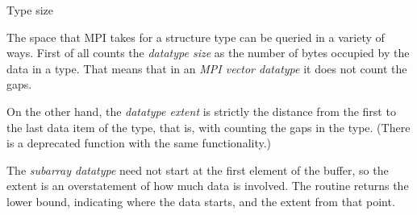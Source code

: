  {Type size}

The space that MPI takes for a structure type can be queried in a
variety of ways. First of all  counts the
\emph{datatype size} as the 
number of bytes occupied by the data in a type. That means that in an
\emph{MPI vector datatype} it does not
count the gaps.
%
%

On the other hand, the \emph{datatype
  extent} is strictly the distance from the
first to the last data item of the type, that is, with counting the
gaps in the type.
%
%
%
(There is a deprecated function  with the same
functionality.)

The \emph{subarray datatype} need not
start at the first element of the buffer, so the extent is an
overstatement of how much data is involved. The routine
 returns the lower bound,
indicating where the data starts, and the extent from that point.
%

\begin{comment}
  Suppose we implement gather (see also Section Gather ) as a spanning
  tree implemented on top of point-to-point routines. Since the receive
  buffer is only valid on the root process, one will need to allocate
  some temporary space for receiving data on intermediate
  nodes. However, the datatype extent cannot be used as an estimate of
  the amount of space that needs to be allocated, if the user has
  modified the extent, for example by using MPI_TYPE_CREATE_RESIZED. The
  functions MPI_TYPE_GET_TRUE_EXTENT and MPI_TYPE_GET_TRUE_EXTENT_X are
  provided which return the true extent of the datatype.
\end{comment}

